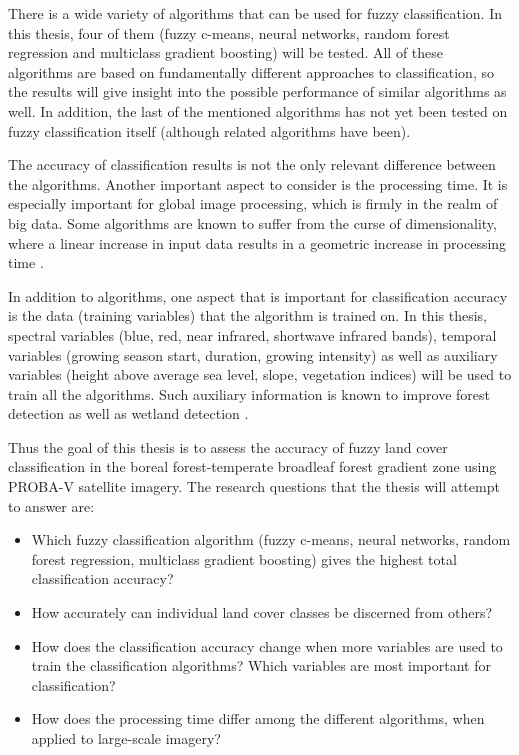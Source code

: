 \documentclass[a4paper,10pt]{article}
\begin{document}
There is a wide variety of algorithms that can be used for fuzzy classification. In this thesis, four of them (fuzzy c-means, neural networks, random forest regression and multiclass gradient boosting) will be tested. All of these algorithms are based on fundamentally different approaches to classification, so the results will give insight into the possible performance of similar algorithms as well. In addition, the last of the mentioned algorithms has not yet been tested on fuzzy classification itself (although related algorithms have been).

The accuracy of classification results is not the only relevant difference between the algorithms. Another important aspect to consider is the processing time. It is especially important for global image processing, which is firmly in the realm of big data. Some algorithms are known to suffer from the curse of dimensionality, where a linear increase in input data results in a geometric increase in processing time \citep{walton2008subpixelrf}.

In addition to algorithms, one aspect that is important for classification accuracy is the data (training variables) that the algorithm is trained on. In this thesis, spectral variables (blue, red, near infrared, shortwave infrared bands), temporal variables (growing season start, duration, growing intensity) as well as auxiliary variables (height above average sea level, slope, vegetation indices) will be used to train all the algorithms. Such auxiliary information is known to improve forest detection as well as wetland detection \citep{sader1995wetlands}.

Thus the goal of this thesis is to assess the accuracy of fuzzy land cover classification in the boreal forest-temperate broadleaf forest gradient zone using PROBA-V satellite imagery. The research questions that the thesis will attempt to answer are:

\begin{itemize}
 \item Which fuzzy classification algorithm (fuzzy c-means, neural networks, random forest regression, multiclass gradient boosting) gives the highest total classification accuracy?
 \item How accurately can individual land cover classes be discerned from others?
 \item How does the classification accuracy change when more variables are used to train the classification algorithms? Which variables are most important for classification?
 \item How does the processing time differ among the different algorithms, when applied to large-scale imagery?
\end{itemize}
\end{document}
